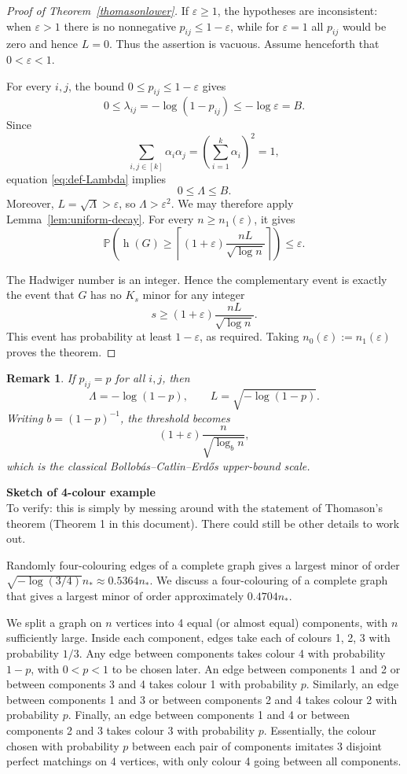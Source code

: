 \documentclass{article}
\newtheorem{remark}[thm]{Remark}
\newcommand{\eps}{\varepsilon}
\newcommand{\s}[1]{\left(#1\right)}
\newcommand{\Prob}{\mathbb{P}}
\DeclareMathOperator{\had}{h}
\begin{document}
\begin{proof}[Proof of Theorem~\ref{thomasonlower}]
If \(\eps\geq1\), the hypotheses are inconsistent: when \(\eps>1\)
there is no nonnegative \(p_{ij}\leq1-\eps\), while for \(\eps=1\)
all \(p_{ij}\) would be zero and hence \(L=0\).  Thus the assertion is
vacuous.  Assume henceforth that \(0<\eps<1\).

For every \(i,j\), the bound \(0\leq p_{ij}\leq1-\eps\) gives
\[
 0\leq\lambda_{ij}=-\log(1-p_{ij})\leq-\log\eps=B.
\]
Since
\[
 \sum_{i,j\in[k]}\alpha_i\alpha_j
 =\left(\sum_{i=1}^k\alpha_i\right)^2=1,
\]
equation \eqref{eq:def-Lambda} implies
\[
 0\leq\Lambda\leq B.
\]
Moreover, \(L=\sqrt{\Lambda}>\eps\), so
\(\Lambda>\eps^2\).  We may therefore apply
Lemma~\ref{lem:uniform-decay}.  For every \(n\geq n_1(\eps)\), it gives
\[
 \Prob\left(
  \had(G)\geq
  \left\lceil(1+\eps)\frac{nL}{\sqrt{\log n}}\right\rceil
 \right)
 \leq\eps.
\]

The Hadwiger number is an integer.  Hence the complementary event is
exactly the event that \(G\) has no \(K_s\) minor for any integer
\[
 s\geq(1+\eps)\frac{nL}{\sqrt{\log n}}.
\]
This event has probability at least \(1-\eps\), as required.  Taking \(n_0(\eps):=n_1(\eps)\) proves the theorem.
\end{proof}

\begin{remark}\label{rem:homogeneous}
If \(p_{ij}=p\) for all \(i,j\), then
\[
 \Lambda=-\log(1-p),\qquad
 L=\sqrt{-\log(1-p)}.
\]
Writing \(b=(1-p)^{-1}\), the threshold becomes
\[
 (1+\eps)\frac{n}{\sqrt{\log_b n}},
\]
which is the classical Bollob\'as--Catlin--Erd\H{o}s upper-bound scale.
\end{remark}

\newpage

\textbf{Sketch of 4-colour example} \\

To verify: this is simply by messing around with the statement of Thomason's theorem (Theorem 1 in this document). There could still be other details to work out.

Randomly four-colouring edges of a complete graph gives a largest minor of order $\sqrt{-\log\s{3/4}}n_* \approx 0.5364 n_*$. We discuss a four-colouring of a complete graph that gives a largest minor of order approximately $0.4704 n_*$.

We split a graph on $n$ vertices into 4 equal (or almost equal) components, with $n$ sufficiently large. Inside each component, edges take each of colours 1, 2, 3 with probability $1/3$. Any edge between components takes colour 4 with probability $1-p$, with $0 < p < 1$ to be chosen later. An edge between components 1 and 2 or between components 3 and 4 takes colour 1 with probability $p$. Similarly, an edge between components 1 and 3 or between components 2 and 4 takes colour 2 with probability $p$. Finally, an edge between components 1 and 4 or between components 2 and 3 takes colour 3 with probability $p$.  Essentially, the colour chosen with probability $p$ between each pair of components imitates 3 disjoint perfect matchings on 4 vertices, with only colour 4 going between all components.
\end{document}
